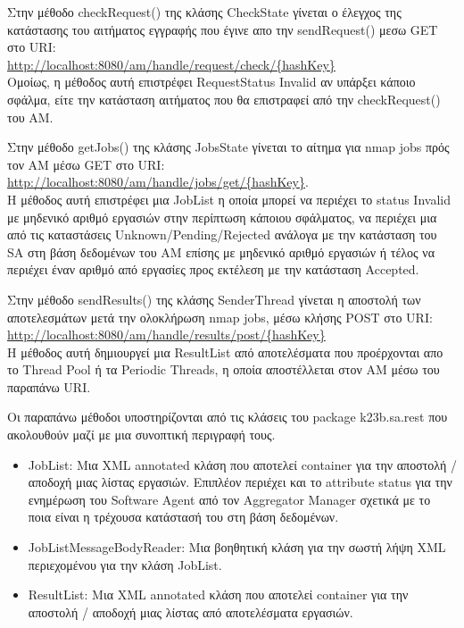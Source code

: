 \documentclass[a4paper,11pt]{article}
\begin{document}
\begin{sloppypar}
Στην μέθοδο checkRequest() της κλάσης CheckState γίνεται ο έλεγχος της κατάστασης του αιτήματος εγγραφής που έγινε απο την sendRequest() μεσω GET στο URI:
\\
\url{http://localhost:8080/am/handle/request/check/{hashKey}}
\\
Ομοίως, η μέθοδος αυτή επιστρέφει RequestStatus Invalid αν υπάρξει κάποιο σφάλμα, είτε την κατάσταση αιτήματος που θα επιστραφεί από την checkRequest() του ΑΜ.

Στην μέθοδο  getJobs() της κλάσης JobsState γίνεται το αίτημα για nmap jobs πρός τον AM μέσω GET στο URI:
\\
\url{http://localhost:8080/am/handle/jobs/get/{hashKey}}.
\\
Η μέθοδος αυτή επιστρέφει μια JobList η οποία μπορεί να περιέχει το status Invalid με μηδενικό αριθμό εργασιών στην περίπτωση κάποιου σφάλματος, να περιέχει μια από τις καταστάσεις Unknown/Pending/Rejected ανάλογα με την κατάσταση του SA στη βάση δεδομένων του AM επίσης με μηδενικό αριθμό εργασιών ή τέλος να περιέχει έναν αριθμό από εργασίες προς εκτέλεση με την κατάσταση Accepted.

Στην μέθοδο sendResults() της κλάσης SenderThread γίνεται η αποστολή των αποτελεσμάτων μετά την ολοκλήρωση nmap jobs, μέσω κλήσης POST στο URI:
\\
\url{http://localhost:8080/am/handle/results/post/{hashKey}}
\\
Η μέθοδος αυτή δημιουργεί μια ResultList από αποτελέσματα που προέρχονται απο το Thread Pool ή τα Periodic Threads, η οποία αποστέλλεται στον AM μέσω του παραπάνω URI.

\newpage


Οι παραπάνω μέθοδοι υποστηρίζονται από τις κλάσεις του package k23b.sa.rest που ακολουθούν μαζί με μια συνοπτική περιγραφή τους.

\begin{itemize}

\item JobList: Μια XML annotated κλάση που αποτελεί container για την αποστολή / αποδοχή μιας λίστας εργασιών. Επιπλέον περιέχει και το attribute status για την ενημέρωση του Software Agent από τον Aggregator Manager σχετικά με το ποια είναι η τρέχουσα κατάστασή του στη βάση δεδομένων.

\item JobListMessageBodyReader: Μια βοηθητική κλάση για την σωστή λήψη XML περιεχομένου για την κλάση JobList.

\item ResultList: Μια XML annotated κλάση που αποτελεί container για την αποστολή / αποδοχή μιας λίστας από αποτελέσματα εργασιών.


\end{itemize}
\end{sloppypar}
\end{document}
